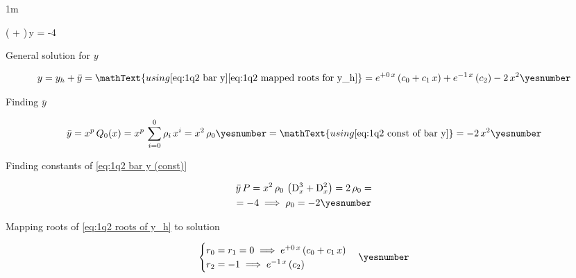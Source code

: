 \documentclass["AM3C-tests_resolutions.tex"]{subfiles}
\begin{document}
\begin{questionBox}1m{} %
  \begin{BM}
    ( + )\,y = -4
  \end{BM}


  \answer{\eqref{eq:1q2 answer}}

  General solution for \(y\)
  \begin{tcolorbox}
    \begin{gather*}
      y
      = y_h 
      + \bar{y}
      = \mathText{using 
        \eqref{eq:1q2 bar y}
        \eqref{eq:1q2 mapped roots for y_h}
      }
      = e^{+0\,x}\,(c_0+c_1\,x)
      + e^{-1\,x}\,(c_2)
      - 2\,x^2
      \yesnumber\label{eq:1q2 answer}
    \end{gather*}
  \end{tcolorbox}



  Finding \(\bar{y}\)
  \begin{tcolorbox}
    \begin{gather*}
      \bar{y}
      = x^p
      \,Q_0(x)
      = x^p
      \,\sum_{i=0}^{0}{
        \rho_i\,x^i
      }
      = x^2\,\rho_0
      \yesnumber\label{eq:1q2 bar y (const)}
      = \mathText{using \eqref{eq:1q2 const of bar y}}
      = -2\,x^2
      \yesnumber\label{eq:1q2 bar y}
    \end{gather*}
  \end{tcolorbox}

  Finding constants of \eqref{eq:1q2 bar y (const)}
  \begin{tcolorbox}
    \begin{gather*}
      \bar{y}\,P
      = x^2\,\rho_0
      \,\left(
        \mdif[3]{x} + \mdif[2]{x}
      \right)
      = 2\,\rho_0
      = \\
      = -4
      \implies \rho_0 = -2
      \yesnumber\label{eq:1q2 const of bar y}
    \end{gather*}
  \end{tcolorbox}

  Mapping roots of \eqref{eq:1q2 roots of y_h} to solution
  \begin{tcolorbox}
    \begin{gather*}
      \begin{cases}
        r_0 = r_1 = 0
        \implies
        e^{+0\,x}\,(c_0+c_1\,x)
        \\
        r_2 = -1
        \implies
        e^{-1\,x}\,(c_2)
      \end{cases}
      \yesnumber\label{eq:1q2 mapped roots for y_h}
    \end{gather*}
  \end{tcolorbox}


\end{questionBox}
\end{document}

